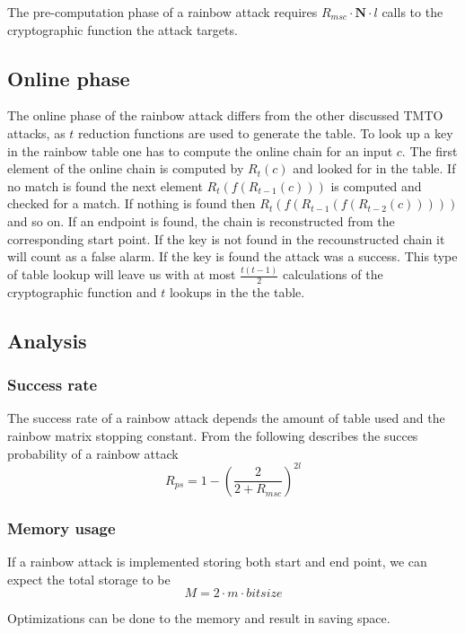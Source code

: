 The pre-computation phase of a rainbow attack requires
$R_{msc} \cdot \textbf{N} \cdot l$ calls to the cryptographic function the attack targets.

\subsection{Online phase}
\label{sec:onlinerb}

The online phase of the rainbow attack differs from the other
discussed TMTO attacks, as $t$ reduction functions are used to
generate the table. To look up a key in the rainbow table one has to
compute the online chain for an input $c$. The first element of
the online chain is computed by $R_t(c)$ and looked for in the
table. If no match is found the next element $R_t(f(R_{t-1}(c)))$ is
computed and checked for a match. If nothing is found then $R_t(f(R_{t-1}(f(R_{t-2}(c)))))$
and so on. If an endpoint is found, the chain is reconstructed from the corresponding start
point. If the key is not found in the recounstructed chain it will count
as a false alarm. If the key is found the attack was a
success. This type of table lookup will leave us with at most
$\frac{t(t - 1)}{2}$ calculations of the cryptographic function and
$t$ lookups in the the table.
\subsection{Analysis}

\subsubsection{Success rate}

The success rate of a rainbow attack depends the amount of table used
and the rainbow matrix stopping constant. From \cite[Proposition
29]{176} the following describes the succes probability of a rainbow attack
\[R_{ps} = 1 - \left( \frac{2}{2+R_{msc}} \right)^{2l}\]

\subsubsection{Memory usage}

If a rainbow attack is implemented storing both start and end point,
we can expect the total storage to be
\begin{equation}
 M = 2 \cdot m \cdot bitsize
\end{equation}

Optimizations can be done to the memory and result in saving
space.




